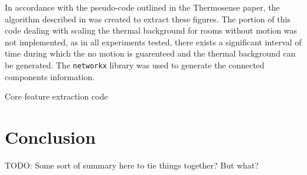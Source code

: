\documentclass[../thesis/thesis.tex]{subfiles}
\begin{document}
In accordance with the pseudo-code outlined in the Thermosense paper, the algorithm described in  was created to extract these figures. The portion of this code dealing with scaling the thermal background for rooms without motion was not implemented, as in all experiments tested, there exists a significant interval of time during which the no motion is guarenteed and the thermal background can be generated. The \texttt{networkx} library was used to generate the connected components information.

\begin{listing}
\centering

\caption{Core feature extraction code}
\label{lst:exps:featcode}
\end{listing}


\section{Conclusion}
TODO: Some sort of summary here to tie things together? But what?
 
\end{document}
